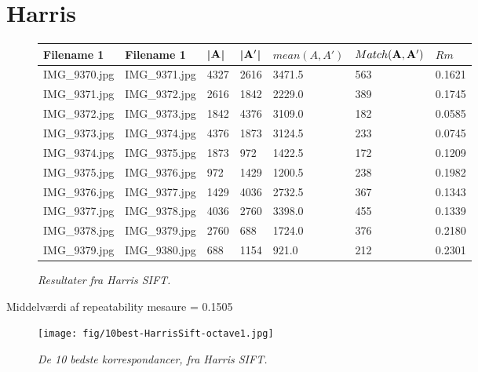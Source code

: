 \section{Harris}


\begin{figure}[H]
    \centering
    \begin{center}    
    \begin{tabular}{ | l | l | l | l | l | l | l |}
    \hline
    Filename 1 & Filename 1 & |$\bold{A}$| & |$\bold{A'}$| & $mean(A,A')$ & $Match(\bold{A}, \bold{A}')$ & $Rm$ \\ \hline
IMG\_9370.jpg &	IMG\_9371.jpg &	4327 &	2616 &	3471.5 &	563 &	0.1621\\ \hline
IMG\_9371.jpg &	IMG\_9372.jpg &	2616 &	1842 &	2229.0 &	389 &	0.1745\\ \hline
IMG\_9372.jpg &	IMG\_9373.jpg &	1842 &	4376 &	3109.0 &	182 &	0.0585\\ \hline
IMG\_9373.jpg &	IMG\_9374.jpg &	4376 &	1873 &	3124.5 &	233 &	0.0745\\ \hline
IMG\_9374.jpg &	IMG\_9375.jpg &	1873 &	972 &	1422.5 &	172 &	0.1209\\ \hline
IMG\_9375.jpg &	IMG\_9376.jpg &	972 &	1429 &	1200.5 &	238 &	0.1982\\ \hline
IMG\_9376.jpg &	IMG\_9377.jpg &	1429 &	4036 &	2732.5 &	367 &	0.1343\\ \hline
IMG\_9377.jpg &	IMG\_9378.jpg &	4036 &	2760 &	3398.0 &	455 &	0.1339\\ \hline
IMG\_9378.jpg &	IMG\_9379.jpg &	2760 &	688 &	1724.0 &	376 &	0.2180\\ \hline
IMG\_9379.jpg &	IMG\_9380.jpg &	688 &	1154 &	921.0  &	212 &	0.2301\\ \hline
    \end{tabular}       
    \caption{{\footnotesize \textit{Resultater fra Harris SIFT.}}}
    \label{tab:HARRISOCTAVE2}
     \end{center}
     \vspace{-2.5em}
\end{figure} \noindent
Middelværdi af repeatability mesaure  = 0.1505
\begin{figure}[H]
    \centering
    \texttt{[image: fig/10best-HarrisSift-octave1.jpg]}
    \vspace{-0.5em}   
    \begin{center}
    \caption{{\footnotesize \textit{ De 10 bedste korrespondancer, fra Harris SIFT.}}}
    \label{fig:harsift}
     \end{center}
  \end{figure}
       \vspace{-2.7em}
\noindent

